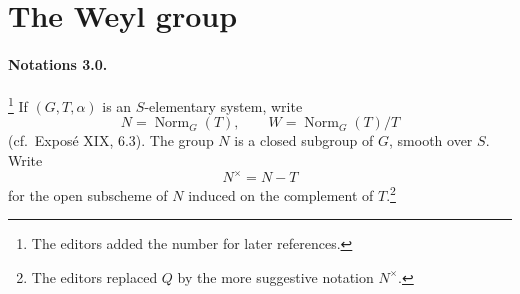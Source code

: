 \begin{center}

  \medskip

  \medskip
\end{center}

\section{The Weyl group}

\paragraph{\textbf{Notations 3.0.}}\footnote{The editors added the
number  for later references.}
If \((G,T,\alpha)\) is an \(S\)-elementary system, write
\[
  N=\operatorname{Norm}_G(T),
  \qquad
  W=\operatorname{Norm}_G(T)/T
\]
\textup{(cf.\ Exposé XIX, 6.3)}.  The group \(N\) is a closed
subgroup of \(G\), smooth over \(S\).  Write
\[
  N^\times=N-T
\]
for the open subscheme of \(N\) induced on the complement of
\(T\).\footnote{The editors replaced \(Q\) by the more suggestive
notation \(N^\times\).}

